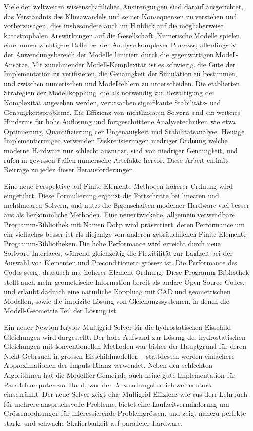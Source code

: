 Viele der weltweiten wissenschaftlichen Anstrengungen sind darauf
ausgerichtet, das Verständnis des Klimawandels und seiner Konsequenzen zu
verstehen und vorherzusagen, dies insbesondere auch im Hinblick auf die
möglicherweise katastrophalen Auswirkungen auf die Gesellschaft. Numerische
Modelle spielen eine immer wichtigere Rolle bei der Analyse komplexer
Prozesse, allerdings ist der Anwendungsbereich der Modelle limitiert durch die
gegenwärtigen Modell-Ansätze.  Mit zunehmender Modell-Komplexität ist es
schwierig, die Güte der Implementation zu verifizieren, die Genauigkeit der
Simulation zu be\-stimmen, und zwischen numerischen und Modellfehlern zu
unterscheiden.  Die etablierten Strategien der Modellkopplung, die als
notwendig zur Bewältigung der Komplexität angesehen werden, verursachen
signifikante Stabilitäts- und Genauigkeitsprobleme.  Die Effizienz von
nichtlinearen Solvern sind ein weiteres Hindernis für hohe Auflösung und
fortgeschrittene Analysetechniken wie etwa Optimierung, Quantifizierung der
Ungenauigkeit und Stabilitätsanalyse.  Heutige Implementierungen verwenden
Diskretisierungen niedriger Ordnung welche moderne Hardware nur schlecht
ausnutzt, sind von niedriger Genauigkeit, und rufen in gewissen Fällen
numerische Artefakte hervor.  Diese Arbeit enthält Beiträge zu jeder dieser
Herausforderungen.

Eine neue Perspektive auf Finite-Elemente Methoden höherer Ordnung wird
eingeführt.  Diese Formulierung ergänzt die Fortschritte bei linearen und
nichtlinearen Solvern, und nützt die Eigenschaften moderner Hardware viel
besser aus als herkömmliche Methoden.  Eine neuentwickelte, allgemein
verwendbare Programm-Bibliothek mit Namen Dohp wird präsentiert, deren
Performance um ein vielfaches besser ist als diejenige von anderen
gebräuchlichen Finite-Elemente Programm-Bibliotheken.  Die hohe Performance
wird erreicht durch neue Software-Interfaces, während gleichzeitig die
Flexibilität zur Laufzeit bei der Auswahl von Elementen und Preconditionern
grösser ist.  Die Performance des Codes steigt drastisch mit höherer
Element-Ordnung.  Diese Programm-Bibliothek stellt auch mehr geometrische
Information bereit als andere Open-Source Codes, und erlaubt dadurch eine
natürliche Kopplung mit CAD und geometrischen Modellen, sowie die implizite
Lösung von Gleichungssystemen, in denen die Modell-Geometrie Teil der Lösung
ist.

Ein neuer Newton-Krylov Multigrid-Solver für die hydrostatischen
Eisschild-Gleichungen wird dargestellt.  Der hohe Aufwand zur Lösung der
hydrostatischen Gleichungen mit konventionellen Methoden war bisher der
Hauptgrund für deren Nicht-Gebrauch in grossen Eisschildmodellen --
stattdessen werden einfachere Approximationen der Impuls-Bilanz verwendet.
Neben den schlechten Algorithmen hat die Modellier-Gemeinde auch keine gute
Implementation für Parallelcomputer zur Hand, was den Anwendungsbereich weiter
stark einschränkt.  Der neue Solver zeigt eine Multigrid-Effizienz wie aus dem
Lehrbuch für mehrere anspruchsvolle Probleme, bietet eine Laufzeitverminderung
um Grössenordnungen für interessierende Problemgrössen, und zeigt nahezu
perfekte starke und schwache Skalierbarkeit auf paralleler Hardware.


